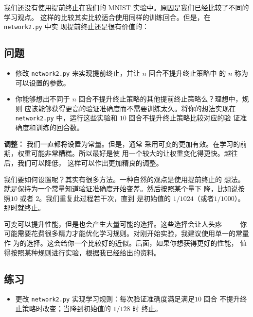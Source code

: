 我们还没有使用提前终止在我们的 MNIST 实验中。原因是我们已经比较了不同的学习观点。
这样的比较其实比较适合使用同样的训练回合。但是，在 \lstinline!network2.py! 中实
现提前终止还是很有价值的：

\subsection*{问题}

\begin{itemize}
\item 修改 \lstinline!network2.py! 来实现提前终止，并让 $n$ 回合不提升终止策略中
  的 $n$ 称为可以设置的参数。
\item 你能够想出不同于 $n$ 回合不提升终止策略的其他提前终止策略么？理想中，规则
  应该能够获得更高的验证准确度而不需要训练太久。将你的想法实现在
  \lstinline!network2.py! 中，运行这些实验和 $10$ 回合不提升终止策略比较对应的验
  证准确度和训练的回合数。
\end{itemize}

\textbf{\learningrate{}调整：} 我们一直都将\learningrate{}设置为常量。但是，通常
采用可变的\learningrate{}更加有效。在学习的前期，权重可能非常糟糕。所以最好是使
用一个较大的\learningrate{}让权重变化得更快。越往后，我们可以降低\learningrate{}，
这样可以作出更加精良的调整。

我们要如何设置\learningrate{}呢？其实有很多方法。一种自然的观点是使用提前终止的
想法。就是保持\learningrate{}为一个常量知道验证准确度开始变差。然后按照某个量下
降\learningrate{}，比如说按照$10$ 或者 $2$。我们重复此过程若干次，直到%
\learningrate{}是初始值的 $1/1024$（或者$1/1000$）。那时就终止。

可变\learningrate{}可以提升性能，但是也会产生大量可能的选择。这些选择会让人头疼
—— 你可能需要花费很多精力才能优化学习规则。对刚开始实验，我建议使用单一的常量作
为\learningrate{}的选择。这会给你一个比较好的近似。后面，如果你想获得更好的性能，
值得按照某种规则进行实验，根据我已经给出的资料。

\subsection*{练习}

\begin{itemize}
\item 更改 \lstinline!network2.py! 实现学习规则：每次验证准确度满足满足$10$ 回合
  不提升终止策略时改变\learningrate{}；当\learningrate{}降到初始值的 $1/128$ 时
  终止。
\end{itemize}

